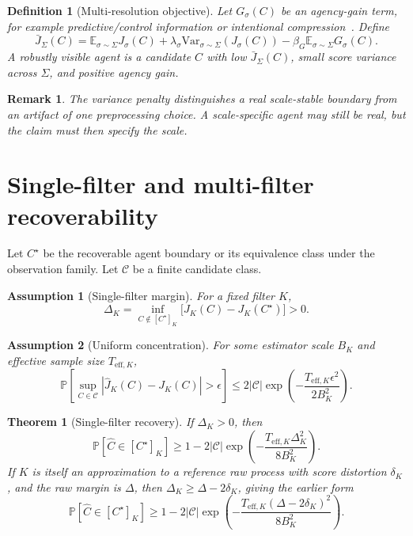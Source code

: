 \documentclass[10pt]{article}
\newtheorem{definition}{Definition}
\newtheorem{assumption}{Assumption}
\newtheorem{theorem}{Theorem}
\newtheorem{remark}{Remark}
\newcommand{\E}{\mathbb E}
\newcommand{\Pbb}{\mathbb P}
\newcommand{\cC}{\mathcal C}
\newcommand{\Var}{\mathrm{Var}}
\begin{document}
\begin{definition}[Multi-resolution objective]
Let \(G_\sigma(C)\) be an agency-gain term, for example predictive/control information or intentional compression~\cite{eis2025}. Define
\begin{equation}
\bar J_\Sigma(C)
=
\E_{\sigma\sim\Sigma}J_\sigma(C)
+
\lambda_\sigma\Var_{\sigma\sim\Sigma}(J_\sigma(C))
-
\beta_G\E_{\sigma\sim\Sigma}G_\sigma(C).
\label{eq:multi_res_objective}
\end{equation}
A robustly visible agent is a candidate \(C\) with low \(\bar J_\Sigma(C)\), small score variance across \(\Sigma\), and positive agency gain.
\end{definition}

\begin{remark}
The variance penalty distinguishes a real scale-stable boundary from an artifact of one preprocessing choice. A scale-specific agent may still be real, but the claim must then specify the scale.
\end{remark}

\section{Single-filter and multi-filter recoverability}

Let \(C^\star\) be the recoverable agent boundary or its equivalence class under the observation family. Let \(\cC\) be a finite candidate class.

\begin{assumption}[Single-filter margin]
For a fixed filter \(K\),
\[
\Delta_K
=
\inf_{C\notin[C^\star]_K}
\bigl[J_K(C)-J_K(C^\star)\bigr]
>0.
\]
\end{assumption}

\begin{assumption}[Uniform concentration]
For some estimator scale \(B_K\) and effective sample size \(T_{\mathrm{eff},K}\),
\[
\Pbb\!\left[
\sup_{C\in\cC}|\hat J_K(C)-J_K(C)|>\epsilon
\right]
\le
2|\cC|
\exp\!\left(
-\frac{T_{\mathrm{eff},K}\epsilon^2}{2B_K^2}
\right).
\]
\end{assumption}

\begin{theorem}[Single-filter recovery]
If \(\Delta_K>0\), then
\begin{equation}
\Pbb[\hat C\in[C^\star]_K]
\ge
1-
2|\cC|
\exp\!\left(
-\frac{T_{\mathrm{eff},K}\Delta_K^2}{8B_K^2}
\right).
\label{eq:single_filter_recovery}
\end{equation}
If \(K\) is itself an approximation to a reference raw process with score distortion \(\delta_K\), and the raw margin is \(\Delta\), then \(\Delta_K\ge\Delta-2\delta_K\), giving the earlier form
\[
\Pbb[\hat C\in[C^\star]_K]
\ge
1-
2|\cC|
\exp\!\left(
-\frac{T_{\mathrm{eff},K}(\Delta-2\delta_K)^2}{8B_K^2}
\right).
\]
\end{theorem}
\end{document}
